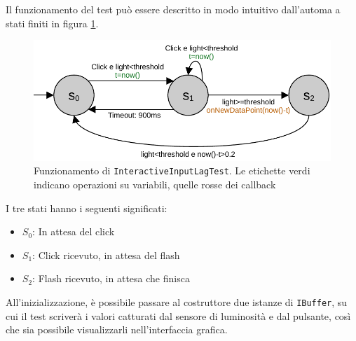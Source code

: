 Il funzionamento del test può essere descritto in modo intuitivo dall'automa a stati finiti in figura \ref{fig:interactiveInputLagTest_fsm}.

\begin{figure}[H]
	\centering
	\includegraphics[width=.8\textwidth]{Applicazione_files/interactiveInputLagTest_fsm.pdf}
	\caption{Funzionamento di \texttt{InteractiveInputLagTest}. Le etichette verdi indicano operazioni su variabili, quelle rosse dei callback}
	\label{fig:interactiveInputLagTest_fsm}
\end{figure}

I tre stati hanno i seguenti significati:\begin{itemize}
	\item \textbf{$S_0$}: In attesa del click
	\item \textbf{$S_1$}: Click ricevuto, in attesa del flash
	\item \textbf{$S_2$}: Flash ricevuto, in attesa che finisca
\end{itemize}

All'inizializzazione, è possibile passare al costruttore due istanze di \texttt{IBuffer}, su cui il test scriverà i valori catturati dal sensore di luminosità e dal pulsante, così che sia possibile visualizzarli nell'interfaccia grafica.

